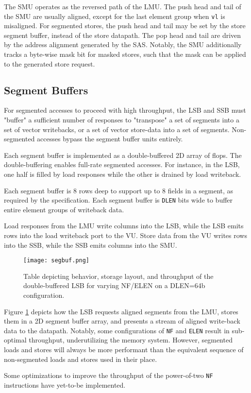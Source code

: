The SMU operates as the reversed path of the LMU.
The push head and tail of the SMU are usually aligned, except for the last element group when \texttt{vl} is misaligned.
For segmented stores, the push head and tail may be set by the store segment buffer, instead of the store datapath.
The pop head and tail are driven by the address alignment generated by the SAS.
Notably, the SMU additionally tracks a byte-wise mask bit for masked stores, such that the mask can be applied to the generated store request.

\subsection{Segment Buffers}

For segmented accesses to proceed with high throughput, the LSB and SSB must "buffer" a sufficient number of responses to "transpose" a set of segments into a set of vector writebacks, or a set of vector store-data into a set of segments.
Non-segmented accesses bypass the segment buffer units entirely.

Each segment buffer is implemented as a double-buffered 2D array of flops.
The double-buffering enables full-rate segmented accesses.
For instance, in the LSB, one half is filled by load responses while the other is drained by load writeback.

Each segment buffer is 8 rows deep to support up to 8 fields in a segment, as required by the specification.
Each segment buffer is \texttt{DLEN} bits wide to buffer entire element groups of writeback data.

Load responses from the LMU write columns into the LSB, while the LSB emits rows into the load writeback port to the VU.
Store data from the VU writes rows into the SSB, while the SSB emits columns into the SMU.

\begin{figure}[hbtp]
  \centering
  \texttt{[image: segbuf.png]}
  \caption{Table depicting behavior, storage layout, and throughput of the double-buffered LSB for varying NF/ELEN on a DLEN=64b configuration.}
  \label{fig:segbuf}
\end{figure}

Figure \ref{fig:segbuf} depicts how the LSB requests aligned segments from the LMU, stores them in a 2D segment buffer array, and presents a stream of aligned write-back data to the datapath.
Notably, some configurations of \texttt{NF} and \texttt{ELEN} result in sub-optimal throughput, underutilizing the memory system.
However, segmented loads and stores will always be more performant than the equivalent sequence of non-segmented loads and stores used in their place.

Some optimizations to improve the throughput of the power-of-two \texttt{NF} instructions have yet-to-be implemented.
